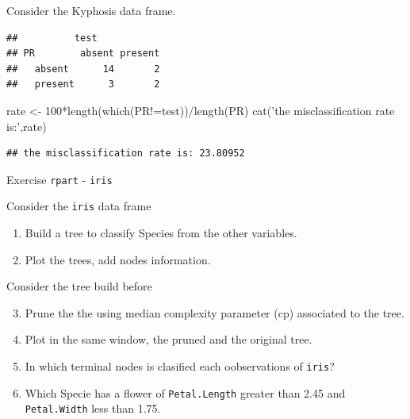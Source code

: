 \documentclass[
  10pt,
  ignorenonframetext,
]{beamer}
\newenvironment{Shaded}{}{}
\newcommand{\DecValTok}[1]{#1}
\newcommand{\KeywordTok}[1]{\textcolor[rgb]{0.00,0.00,1.00}{#1}}
\newcommand{\NormalTok}[1]{#1}
\newcommand{\OperatorTok}[1]{#1}
\newcommand{\StringTok}[1]{\textcolor[rgb]{0.00,0.50,0.50}{#1}}
\providecommand{\tightlist}{%
  \setlength{\itemsep}{0pt}\setlength{\parskip}{0pt}}
\begin{document}
\begin{frame}[fragile]{Consider the Kyphosis data frame.}
\begin{verbatim}
##          test
## PR        absent present
##   absent      14       2
##   present      3       2
\end{verbatim}

\begin{Shaded}
\begin{Highlighting}[]
\NormalTok{rate <-}\StringTok{ }\DecValTok{100}\OperatorTok{*}\KeywordTok{length}\NormalTok{(}\KeywordTok{which}\NormalTok{(PR}\OperatorTok{!=}\NormalTok{test))}\OperatorTok{/}\KeywordTok{length}\NormalTok{(PR)}
\KeywordTok{cat}\NormalTok{(}\StringTok{'the misclassification rate is:'}\NormalTok{,rate)}
\end{Highlighting}
\end{Shaded}

\begin{verbatim}
## the misclassification rate is: 23.80952
\end{verbatim}

\end{frame}

\begin{frame}[fragile]{Exercise \texttt{rpart} - \texttt{iris}}
\protect\hypertarget{exercise-rpart---iris}{}

\begin{block}{Consider the \texttt{iris} data frame}

\begin{enumerate}
[1)]
\tightlist
\item
  Build a tree to classify Species from the other variables.
\item
  Plot the trees, add nodes information.
\end{enumerate}

\end{block}

\begin{block}{Consider the tree build before}

\begin{enumerate}
[1)]
\setcounter{enumi}{2}
\tightlist
\item
  Prune the the using median complexity parameter (cp) associated to the
  tree.
\item
  Plot in the same window, the pruned and the original tree.
\item
  In which terminal nodes is clasified each oobservations of
  \texttt{iris}?
\item
  Which Specie has a flower of \texttt{Petal.Length} greater than 2.45
  and \texttt{Petal.Width} less than 1.75.
\end{enumerate}

\end{block}

\end{frame}
\end{document}
